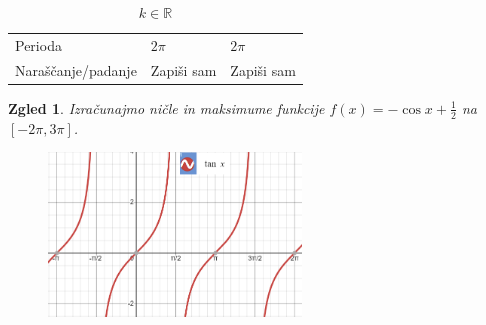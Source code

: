 \documentclass{article}
\newtheorem*{zgled}{Zgled}
\begin{document}
\begin{table}[H]
\begin{tabular}{l|l|l}
Perioda                                                                                                                 & $2\pi$                                & $2\pi$                                                                       \\
Naraščanje/padanje                                                                                                      & Zapiši sam                            & Zapiši sam                                                                  
\end{tabular}
\caption{$k\in \mathbb{R}$}
\end{table}

\begin{zgled}
    Izračunajmo ničle in maksimume funkcije $f(x)=-\cos x+\frac{1}{2}$ na $[-2\pi,3\pi]$.
\end{zgled}

\begin{figure}[H]
\includegraphics[width=0.6\textwidth]{trigonometrija.graftan.png}
\centering
\end{figure}
\end{document}
